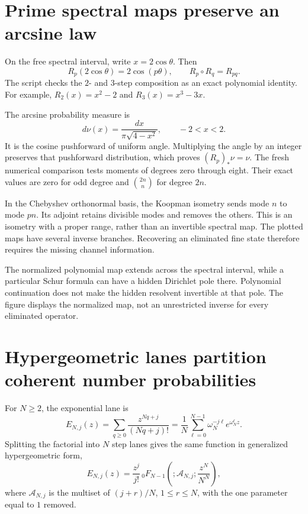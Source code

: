 \clearpage
\section{Prime spectral maps preserve an arcsine law}

On the free spectral interval, write $x=2\cos\theta$. Then
\[
R_p(2\cos\theta)=2\cos(p\theta),\qquad
R_p\circ R_q=R_{pq}.
\]
The script checks the $2$- and $3$-step composition as an exact polynomial identity. For example, $R_2(x)=x^2-2$ and $R_3(x)=x^3-3x$.

The arcsine probability measure is
\[
d\nu(x)=\frac{dx}{\pi\sqrt{4-x^2}},\qquad -2<x<2.
\]
It is the cosine pushforward of uniform angle. Multiplying the angle by an integer preserves that pushforward distribution, which proves $(R_p)_*\nu=\nu$. The fresh numerical comparison tests moments of degrees zero through eight. Their exact values are zero for odd degree and $\binom{2n}{n}$ for degree $2n$.

In the Chebyshev orthonormal basis, the Koopman isometry sends mode $n$ to mode $pn$. Its adjoint retains divisible modes and removes the others. This is an isometry with a proper range, rather than an invertible spectral map. The plotted maps have several inverse branches. Recovering an eliminated fine state therefore requires the missing channel information.

The normalized polynomial map extends across the spectral interval, while a particular Schur formula can have a hidden Dirichlet pole there. Polynomial continuation does not make the hidden resolvent invertible at that pole. The figure displays the normalized map, not an unrestricted inverse for every eliminated operator.



\clearpage
\section{Hypergeometric lanes partition coherent number probabilities}

For $N\ge2$, the exponential lane is
\[
E_{N,j}(z)=\sum_{q\ge0}\frac{z^{Nq+j}}{(Nq+j)!}
=\frac1N\sum_{\ell=0}^{N-1}\omega_N^{-j\ell}e^{\omega_N^\ell z}.
\]
Splitting the factorial into $N$ step lanes gives the same function in generalized hypergeometric form,
\[
E_{N,j}(z)=\frac{z^j}{j!}\,
{}_0F_{N-1}\!\left(;\mathcal A_{N,j};\frac{z^N}{N^N}\right),
\]
where $\mathcal A_{N,j}$ is the multiset of $(j+r)/N$, $1\le r\le N$, with the one parameter equal to $1$ removed.

